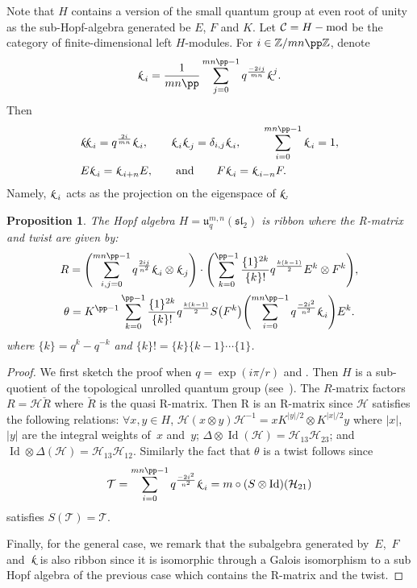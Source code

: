 \documentclass[10pt,a4paper]{amsart}
\newtheorem{proposition}{Proposition}
\numberwithin{equation}{section}
\newcommand{\smk}{{\fontfamily{pzc}\selectfont \text{k}}}
\numberwithin{theorem}{section}
\numberwithin{proposition}{section}
\numberwithin{definition}{section}
\numberwithin{lemma}{section}
\numberwithin{corollary}{section}
\numberwithin{remark}{section}
\numberwithin{example}{section}
\newcommand{\cat}{\mathcal{C}}
\newcommand{\Z}{\ensuremath{\mathbb{Z}}}
\newcommand{\Id}{\operatorname{Id}}
\begin{document}
 Note that $H$ contains a version of the small quantum group at even
 root of unity as the sub-Hopf-algebra generated be $E$, $F$ and $K$.
 Let
$\cat=H-{\rm mod}$
 be the
 category of finite-dimensional left
 $H$-modules.
\noindent
For $i\in\Z/mn{\pp}\Z$, denote
\[
\smk_{\; i} = \frac{1}{mn{\pp}}\sum_{j=0}^{mn{\pp}-1} q^{\frac{-2ij}{mn}}\smk^{\, j}.
\]
Then
\begin{align*}
&\smk\smk_{\; i} = q^{\frac{2i}{mn}}\smk_{\; i},\qquad \smk_{\; i}\smk_{\; j}=\delta_{i,j}\smk_{\; i}, \qquad \sum_{i=0}^{mn{\pp}-1} \smk_{\; i}=1, \\
&E\smk_{\; i}=\smk_{\; i+n}E, \qquad\text{and}\qquad F\smk_{\; i}=\smk_{\; i-n}F.
\end{align*}
Namely, $\smk_{\; i}$ acts as the projection on the  eigenspace of $\smk$.
\begin{proposition}
 The Hopf algebra $H=\mathfrak{u}^{m,n}_{q}(\mathfrak{sl}_2)$ is
 ribbon where the R-matrix and twist are given by:
 \begin{gather*}
 R=\Biggl(\sum_{i,j=0}^{mn{\pp}-1}
 q^{\frac{2ij}{n^2}}\smk_{\; i}\otimes
 \smk_{\; j}\Biggr)\cdot\Biggl(\sum_{k=0}^{{\pp}-1}
 \frac{\{1\}^{2k}}{\{k\}!}q^\frac{k(k-1)}{2} E^k\otimes
 F^k\Biggr),
 \\
 \theta=K^{{\pp}-1}\sum_{k=0}^{{\pp}-1}
 \frac{\{1\}^{2k}}{\{k\}!}q^\frac{k(k-1)}{2}
 S\bigl(F^k\bigr)\Biggl(\sum_{i=0}^{mn{\pp}-1}
 q^{\frac{-2i^2}{n^2}}\smk_{\; i}\Biggr) E^k.
 \end{gather*}
 where $\{k\} = q^k-q^{-k}$ and $\{k\}! = \{k\} \{k-1\} \cdots \{1\}$.
\end{proposition}
\begin{proof} We first sketch the proof when $q=\exp(i\pi/r)$ and
 . Then $H$ is a sub-quotient of the
 topological unrolled quantum group (see~\cite{GHP22}). The
 $R$-matrix factors $R=\mathcal H\check R$ where $\check R$ is the
 quasi R-matrix. Then R is an R-matrix since $\mathcal H$ satisfies
 the following relations: $\forall x,y\in H$,
 $\mathcal H(x\otimes y)\mathcal H^{-1}=xK^{|y|/2}\otimes K^{|x|/2}y$
 where $|x|$, $|y|$ are the integral weights of~$x$ and~$y$;
 $\Delta\otimes\Id(\mathcal H)=\mathcal H_{13}\mathcal H_{23}$; and
 $\Id\otimes\Delta(\mathcal H)=\mathcal H_{13}\mathcal H_{12}$.
 Similarly the fact that $\theta$ is a twist follows since
\[
\mathcal T=\sum_{i=0}^{mn{\pp}-1}
 q^{\frac{-2i^2}{n^2}}\smk_{\; i}=m\circ(S\otimes\Id)(\mathcal H_{21})
\]
 satisfies $S(\mathcal T)=\mathcal T$.

 Finally, for the general case, we remark that the
  subalgebra generated by~$E$,~$F$ and~$\smk$ is
 also ribbon since it is isomorphic through a Galois isomorphism to a
 sub Hopf algebra of the previous case which contains the R-matrix
 and the twist.
\end{proof}
\end{document}
